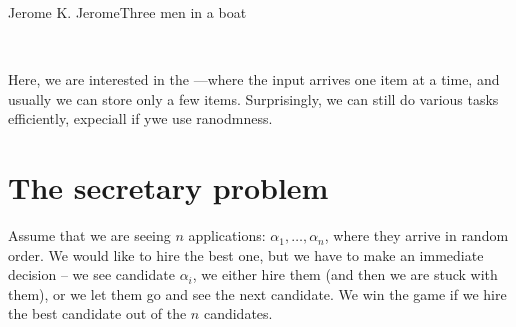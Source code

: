 
%



%
{Jerome K. Jerome}{Three men in a boat}


\noindent%
\ChapterPrefix{}%
\ChapterGen{}

~


\bigskip%


Here, we are interested in the ---where the input arrives one item at a time, and usually we can store only a few items. Surprisingly, we can still do various tasks efficiently, expeciall if ywe use ranodmness.


\section{The secretary problem}

Assume that we are seeing $n$ applications: $\alpha_1, \ldots, \alpha_n$, where they
arrive in random order. We would like to hire the best one, but we have
to make an immediate decision -- we see candidate $\alpha_i$, we either hire
them (and then we are stuck with them), or we let them go and see the
next candidate. We win the game if we hire the best candidate out of the
$n$ candidates.


